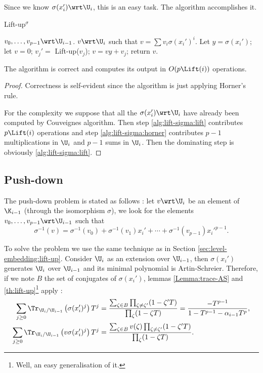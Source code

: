 Since we know $\sigma(x_i')\wrt\U_i$, this is an easy task. The
algorithm  accomplishes it.

\begin{algorithm}
  \caption{Lift-up$^\sigma$}
  \begin{algorithmic}[1]
    \REQUIRE $v_0,\ldots,v_{p-1}\wrt\U_{i-1}$.
    \ENSURE $v\wrt\U_i$ such that $v = \sum v_i\sigma(x_i')^i$.
    \STATE Let $y = \sigma(x_i')$;
    \STATE let $v = 0$;
    \STATE \label{alg:lift-sigma:lift}$v_j' = $ Lift-up($v_j$);
    \STATE \label{alg:lift-sigma:horner}$v = vy + v_j$;
    \ENDFOR
    \STATE return $v$.
  \end{algorithmic}
\end{algorithm}

\begin{theorem}
  The algorithm  is correct and computes its
  output in $O(p\Lift(i))$ operations.
\end{theorem}
\begin{proof}
  Correctness is self-evident since the algorithm is just applying
  Horner's rule.

  For the complexity we suppose that all the $\sigma(x_i')\wrt\U_i$
  have already been computed by Couveignes algorithm. Then step
  \ref{alg:lift-sigma:lift} contributes $p\Lift(i)$ operations and
  step \ref{alg:lift-sigma:horner} contributes $p-1$ multiplications
  in $\U_i$ and $p-1$ sums in $\U_i$. Then the dominating step is
  obviously \ref{alg:lift-sigma:lift}.
\end{proof}


\subsection{Push-down}
\label{sec:isomorphism:push-down}
The push-down problem is stated as follows : let $v\wrt\U_i$ be an
element of $\K_{i-1}$ (through the isomorphism $\sigma$), we look for
the elements $v_0,\ldots,v_{p-1}\wrt\U_{i-1}$ such that
\begin{equation*}
  \sigma^{-1}(v) =
  \sigma^{-1}(v_0) + \sigma^{-1}(v_1)x_i' +
  \cdots + \sigma^{-1}(v_{p-1})x_i'^{p-1}
  \text{.}
\end{equation*}

To solve the problem we use the same technique as in Section
\ref{sec:level-embedding:lift-up}. Consider $\U_i$ as an extension
over $\U_{i-1}$, then $\sigma(x_i')$ generates $\U_i$ over $\U_{i-1}$
and its minimal polynomial is Artin-Schreier. Therefore, if we note
$B$ the set of conjugates of $\sigma(x_i')$, lemmas
\ref{Lemma:trace-AS} and \ref{th:lift-up}\footnote{Well, an easy
  generalisation of it.} apply :
\begin{align*}
  \sum_{j\ge0}\Tr_{\U_i/\U_{i-1}}\left(\sigma(x_i')^j\right)T^j &=
  \frac{\sum_{\zeta\in B}\prod_{\zeta\ne\zeta'}(1-\zeta'T)}
       {\prod_{\zeta}(1-\zeta T)} =
  \frac{-T^{p-1}}{1-T^{p-1}-\alpha_{i-1}T^{p}}
  \text{,}\\
  \sum_{j\ge0}\Tr_{\U_i/\U_{i-1}}\left(v\sigma(x_i')^j\right)T^j &=
  \frac{\sum_{\zeta\in B}v(\zeta)\prod_{\zeta\ne\zeta'}(1-\zeta'T)}
       {\prod_{\zeta}(1-\zeta T)}
       \text{.}
\end{align*}

